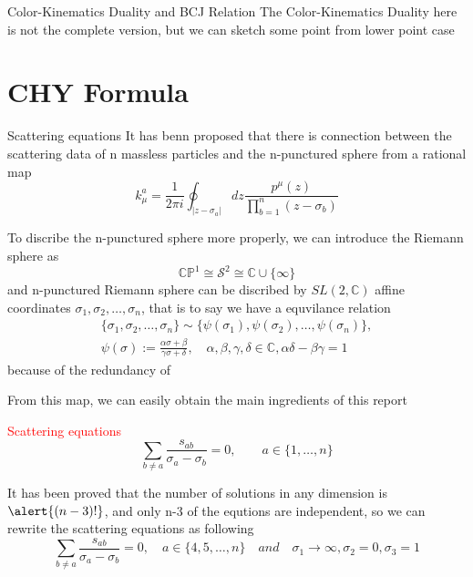 \documentclass{beamer}
\begin{document}
\begin{frame}{Color-Kinematics Duality and BCJ Relation}
The Color-Kinematics Duality here is not the complete version, but we can sketch some point from lower point case
\end{frame}

\section{CHY Formula}
\begin{frame}{Scattering equations}
    It has benn proposed that there is connection between the scattering data of n massless particles and the n-punctured sphere from a rational map
    \begin{equation*}
        k_\mu^a=\frac{1}{2\pi i}\oint_{|z-\sigma_a|}dz\frac{p^\mu(z)}{\prod ^n_{b=1}(z-\sigma_b)}
    \end{equation*}
 
    To discribe the n-punctured sphere more properly, we can introduce the Riemann sphere as
    \begin{equation*}
        \mathbb{CP}^1\cong \mathcal{S}^2\cong \mathbb{C}\cup\{\infty\}
    \end{equation*}
    and n-punctured Riemann sphere can be discribed by $SL(2,\mathbb{C})$ affine coordinates ${\sigma_1,\sigma_2,\ldots,\sigma_n}$, that is to say we have a equvilance relation
    \begin{align*}
        \{\sigma_1,\sigma_2,\ldots,\sigma_n\}\sim\{\psi(\sigma_1),\psi(\sigma_2),\ldots,\psi(\sigma_n)\},\\\psi(\sigma):=\frac{\alpha\sigma+\beta}{\gamma\sigma+\delta},\quad\alpha,\beta,\gamma,\delta\in\mathbb{C},\alpha\delta-\beta\gamma=1
    \end{align*}
    because of the redundancy of 
\end{frame}
\begin{frame}
    From this map, we can easily obtain the main ingredients of this report \\
    

    \begin{block}{\textcolor{red}{Scattering equations}}
        \begin{equation*}
            \sum_{b\neq a } \frac{s_{ab}}{\sigma_a-\sigma_{b}}=0,\qquad a\in \{1,\dots,n\}
        \end{equation*}
    \end{block}
    It has been proved that the number of solutions in any dimension is $\alert{(n-3)!}$, and only \alert{n-3} of the equtions are independent, so we can rewrite the scattering equations as following 
    \begin{equation*}
        \sum_{b\neq a } \frac{s_{ab}}{\sigma_a-\sigma_{b}}=0,\quad a\in \{4,5,\dots,n\}\quad and\quad  \sigma_1\rightarrow\infty,\sigma_2=0,\sigma_3=1
    \end{equation*}
\end{frame}
\end{document}
